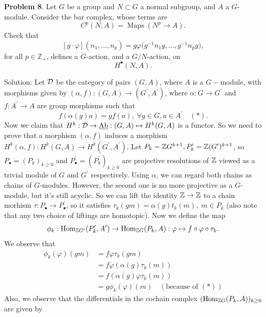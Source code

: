 \begin{dang}
    \textbf{Problem 8}.
Let $G$ be a group and $N \subset G$ a normal subgroup, and $A$ a
$G$-module. Consider the bar complex, whose terms are
\[
C^p(N,A) = \operatorname{Maps}(N^p \to A).
\]
Check that
\[
[g \cdot \varphi](n_1,\ldots,n_p)
=
g\varphi
\bigl(g^{-1}n_1g,\ldots,g^{-1}n_pg\bigr),
\]
for all $p \in \mathbb{Z}_+$, defines a $G$-action, and a
$G/N$-action, on
\[
H^\bullet(N,A).
\]
\end{dang}
Solution: Let $\mathcal{D}$ be the category of pairs $(G,A)$, where $A$ is a $G-$module, with morphisms given by 
$(\alpha,f):(G,A)\to (G^\prime, A^\prime)$, where $\alpha:G\to G^\prime$ and $f:A^\prime\to A$ are group 
morphisms such that
\begin{equation}
    f(\alpha(g)a)=g f(a),\;\forall g\in G, a\in A^\prime\quad(*).
\end{equation}
Now we claim that 
$H^k:\mathcal{D}\to \underline{\text{Ab}}: (G,A)\mapsto H^k(G,A)$ is a functor. So we need to prove that a morphism 
$(\alpha,f)$ induces a morphism $H^k(\alpha,f): H^k(G,A)\to H^k(G^\prime,A^\prime)$. 
Let $P_k=\mathbb{Z} G^{k+1}, P_k^\prime =\mathbb{Z} (G^\prime)^{k+1}$, so $P_\bullet = (P_k)_{k\geq0}$ 
and $P_\bullet^\prime = (P_k^\prime)_{k\geq0}$ are projective resolutions of $\mathbb{Z}$ viewed as a trivial module of 
$G$ and $G^\prime$ respectively. Using $\alpha$, we can regard both chains as chains of $G$-modules. However, the second 
one is no more projective as a $G$-module, but it's still acyclic. So we can lift the identity $\mathbb{Z}\to \mathbb{Z}$ 
to a chain morhism $\tau: P_\bullet\to P_\bullet^\prime$, so it satisfies 
$\tau_k(gm)=\alpha(g)t_k(m),\;m\in P_k$ (also note that any two choice of liftings are homotopic). Now we define the map 
\begin{equation}
    \phi_k:\text{Hom}_{\mathbb{Z} G^\prime}(P_k^\prime, A^\prime)\to\text{Hom}_{\mathbb{Z} G}(P_k,A):\varphi\mapsto f\circ\varphi\circ\tau_k.
\end{equation}
We observe that 
\begin{equation}
    \begin{split}
        \phi_k(\varphi)(gm)&=f\varphi\tau_k(gm)\\
        &=f\varphi(\alpha(g)\tau_k(m))\\
        &=f(\alpha(g)\varphi\tau_k(m))\\
        &=g\phi_k(\varphi)(m)\quad(\text{because of }(*))
    \end{split}
\end{equation}
Also, we observe that the differentials in the cochain complex $(\text{Hom}_{\mathbb{Z} G}(P_k,A))_{k\geq0}$ are given by 
